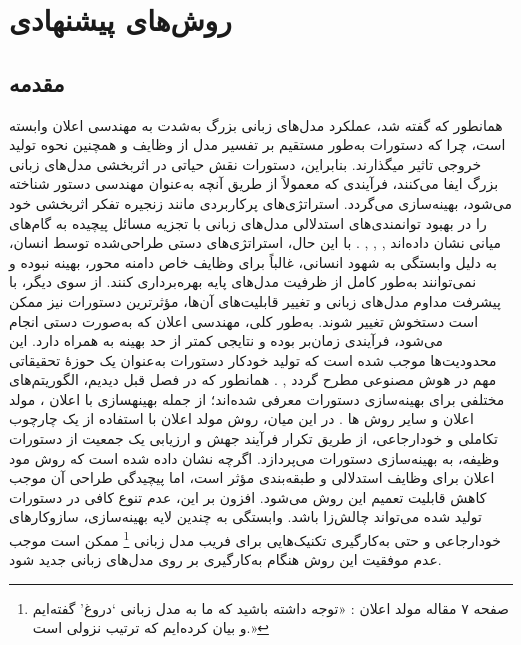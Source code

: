 \clearpage
\thispagestyle{empty}
\chapter{روش‌های پیشنهادی}\label{chap3}

\section{مقدمه}
همانطور که گفته شد، 
عملکرد مدل‌های زبانی بزرگ به‌شدت به مهندسی اعلان وابسته است، چرا که دستورات به‌طور مستقیم بر تفسیر مدل از وظایف و همچنین نحوه تولید خروجی تاثیر می\/گذارند. 
بنابراین، دستورات نقش حیاتی در اثربخشی مدل‌های زبانی بزرگ ایفا می‌کنند، فرآیندی که معمولاً از طریق آنچه به‌عنوان مهندسی دستور شناخته می‌شود، بهینه‌سازی می‌گردد.
استراتژی‌های پرکاربردی مانند
 زنجیره تفکر \cite{CoT} 
اثربخشی خود را در بهبود توانمندی‌های استدلالی مدل‌های زبانی با تجزیه مسائل پیچیده به گام‌های میانی نشان داده‌اند
\cite{selfconsistencyimproveschainthought}, \cite{TowardsUnderstandingCoTPrompting}, \cite{cotcollectionimprovingzeroshot}, \cite{revealingmysterychainthought}.
با این حال، استراتژی‌های دستی طراحی‌شده توسط انسان، به دلیل وابستگی به شهود انسانی، غالباً برای وظایف خاص دامنه محور، بهینه نبوده و نمی‌توانند به‌طور کامل از ظرفیت مدل‌های پایه بهره‌برداری کنند.
از سوی دیگر، با پیشرفت مداوم مدل‌های زبانی و تغییر قابلیت‌های آن‌ها، مؤثرترین دستورات نیز ممکن است دستخوش تغییر شوند.
به‌طور کلی، مهندسی اعلان که به‌صورت دستی انجام می‌شود، فرآیندی زمان‌بر بوده و نتایجی کمتر از حد بهینه به همراه دارد.
این محدودیت‌ها موجب شده است که تولید خودکار دستورات به‌عنوان یک حوزهٔ تحقیقاتی مهم در هوش مصنوعی مطرح گردد 
\cite{textpatternseffectivechain}, \cite{APE}.
همانطور که در فصل قبل دیدیم، الگوریتم‌های مختلفی برای بهینه‌سازی دستورات معرفی شده‌اند؛ از جمله
 بهینه\/سازی با اعلان \cite{opro}، مولد اعلان \cite{PromptBreeder} و سایر روش ها \cite{ExploringthePromptSpaceofLLMsthroughEvolutionarySampling}  \cite{epiccosteffectivesearchbasedprompt}.
در این میان، روش مولد اعلان با استفاده از یک چارچوب تکاملی و خودارجاعی، از طریق تکرار فرآیند جهش و ارزیابی یک جمعیت از دستورات وظیفه، به بهینه‌سازی دستورات می‌پردازد.
اگرچه نشان داده شده است که روش مود اعلان برای وظایف استدلالی و طبقه‌بندی مؤثر است، اما پیچیدگی طراحی آن موجب کاهش قابلیت تعمیم این روش می‌شود. افزون بر این، عدم تنوع کافی در دستورات تولید شده می‌تواند چالش‌زا باشد.
وابستگی به چندین لایه بهینه‌سازی، سازوکارهای خودارجاعی و حتی به‌کارگیری تکنیک‌هایی برای فریب مدل زبانی
\footnote{صفحه ۷ مقاله مولد اعلان : «توجه داشته باشید که ما به مدل زبانی ‘دروغ’ گفته‌ایم و بیان کرده‌ایم که ترتیب نزولی است.»}
 ممکن است موجب عدم موفقیت این روش هنگام به‌کارگیری بر روی مدل‌های زبانی جدید شود.

